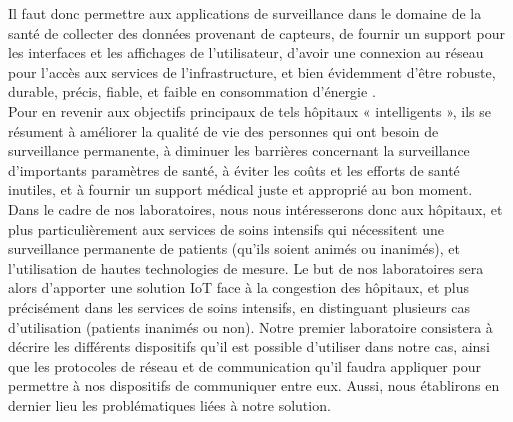 Il faut donc permettre aux applications de surveillance dans le domaine de la santé de collecter des données provenant de capteurs, de fournir un support pour les interfaces et les affichages de l’utilisateur, d’avoir une connexion au réseau pour l’accès aux services de l’infrastructure, et bien évidemment d’être robuste, durable, précis, fiable, et faible en consommation d’énergie \cite{vermesan2014internet}.
\\

Pour en revenir aux objectifs principaux de tels hôpitaux « intelligents », ils se résument à améliorer la qualité de vie des personnes qui ont besoin de surveillance permanente, à diminuer les barrières concernant la surveillance d’importants paramètres de santé, à éviter les coûts et les efforts de santé inutiles, et à fournir un support médical juste et approprié au bon moment.
\\

Dans le cadre de nos laboratoires, nous nous intéresserons donc aux hôpitaux, et plus particulièrement aux services de soins intensifs qui nécessitent une surveillance permanente de patients (qu’ils soient animés ou inanimés), et l’utilisation de hautes technologies de mesure. Le but de nos laboratoires sera alors d’apporter une solution IoT face à la congestion des hôpitaux, et plus précisément dans les services de soins intensifs, en distinguant plusieurs cas d’utilisation (patients inanimés ou non). Notre premier laboratoire consistera à décrire les différents dispositifs qu’il est possible d’utiliser dans notre cas, ainsi que les protocoles de réseau et de communication qu’il faudra appliquer pour permettre à nos dispositifs de communiquer entre eux. Aussi, nous établirons en dernier lieu les problématiques liées à notre solution.
